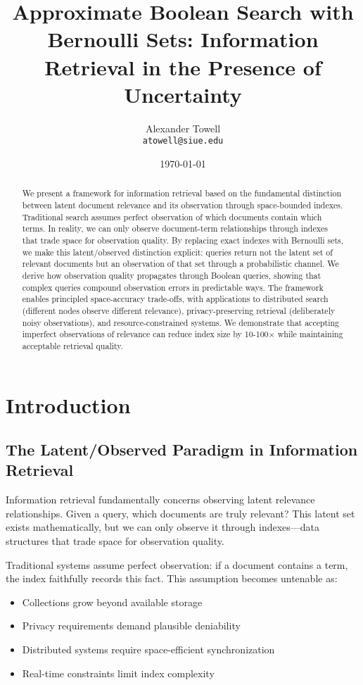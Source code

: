 \documentclass[11pt,final,hidelinks]{article}
\title{Approximate Boolean Search with Bernoulli Sets: Information Retrieval in the Presence of Uncertainty}
\author{
    Alexander Towell\\
    \texttt{atowell@siue.edu}
}
\date{\today}
\begin{document}
\maketitle

\begin{abstract}
We present a framework for information retrieval based on the fundamental distinction between latent document relevance and its observation through space-bounded indexes. Traditional search assumes perfect observation of which documents contain which terms. In reality, we can only observe document-term relationships through indexes that trade space for observation quality. By replacing exact indexes with Bernoulli sets, we make this latent/observed distinction explicit: queries return not the latent set of relevant documents but an observation of that set through a probabilistic channel. We derive how observation quality propagates through Boolean queries, showing that complex queries compound observation errors in predictable ways. The framework enables principled space-accuracy trade-offs, with applications to distributed search (different nodes observe different relevance), privacy-preserving retrieval (deliberately noisy observations), and resource-constrained systems. We demonstrate that accepting imperfect observations of relevance can reduce index size by 10-100× while maintaining acceptable retrieval quality.
\end{abstract}

\section{Introduction}

\subsection{The Latent/Observed Paradigm in Information Retrieval}

Information retrieval fundamentally concerns observing latent relevance relationships. Given a query, which documents are truly relevant? This latent set exists mathematically, but we can only observe it through indexes—data structures that trade space for observation quality.

Traditional systems assume perfect observation: if a document contains a term, the index faithfully records this fact. This assumption becomes untenable as:
\begin{itemize}
    \item Collections grow beyond available storage
    \item Privacy requirements demand plausible deniability
    \item Distributed systems require space-efficient synchronization
    \item Real-time constraints limit index complexity
\end{itemize}
\end{document}
